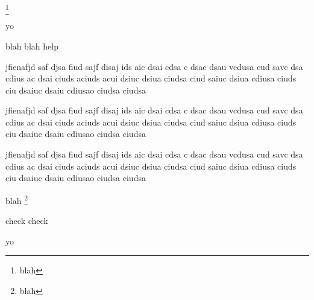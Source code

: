 



\usepackage{lipsum}





 \footnote{blah}

\begin{noteblock}{yo}
\lipsum[1]
\end{noteblock}

\begin{noteblock}{blah blah}
help
\end{noteblock}

\noindent jfienafjd saf djsa fiud sajf disaj ids aic dsai cdsa c dsac dsau vcdusa cud savc dsa cdius ac dsai ciuds aciuds acui dsiuc dsiua ciudsa ciud saiuc dsiua cdiusa ciuds ciu dsaiuc dsaiu cdiusao ciudsa ciudsa

jfienafjd saf djsa fiud sajf disaj ids aic dsai cdsa c dsac dsau vcdusa cud savc dsa cdius ac dsai ciuds aciuds acui dsiuc dsiua ciudsa ciud saiuc dsiua cdiusa ciuds ciu dsaiuc dsaiu cdiusao ciudsa ciudsa

\noindent \begin{minipage}{\textwidth}
jfienafjd saf djsa fiud sajf disaj ids aic dsai cdsa c dsac dsau vcdusa cud savc dsa cdius ac dsai ciuds aciuds acui dsiuc dsiua ciudsa ciud saiuc dsiua cdiusa ciuds ciu dsaiuc dsaiu cdiusao ciudsa ciudsa
\end{minipage}

\newpage

blah \footnote{blah}

\begin{noteblock}{check}
check
\end{noteblock}

\lipsum[2]

\begin{noteblock}{yo}
\lipsum[1]
\end{noteblock}



